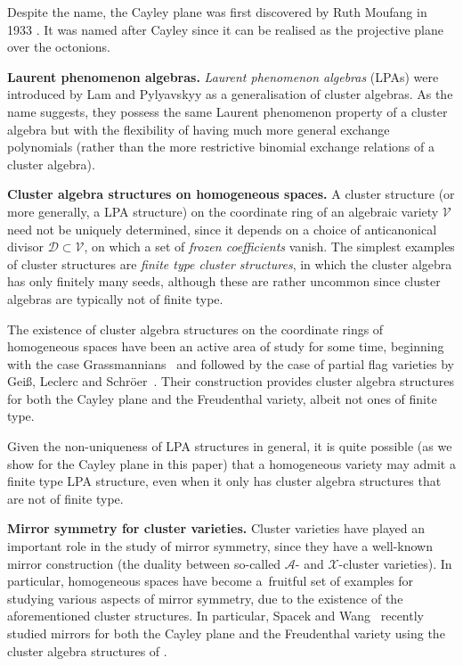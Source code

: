 \documentclass[pdftex]{sigma}
\numberwithin{equation}{section}
\theoremstyle{definition}
\begin{document}
Despite the name, the Cayley plane was first discovered by Ruth Moufang in 1933 \cite{m}. It was named after Cayley since it can be realised as the projective plane over the octonions.

{\bf Laurent phenomenon algebras.}
\emph{Laurent phenomenon algebras} (LPAs) were introduced by Lam and Pylyavskyy \cite{lp} as a generalisation of cluster algebras. As the name suggests, they possess the same Laurent phenomenon property of a cluster algebra but with the flexibility of having much more general exchange polynomials (rather than the more restrictive binomial exchange relations of a cluster algebra).

{\bf Cluster algebra structures on homogeneous spaces.}
A cluster structure (or more generally, a LPA structure) on the coordinate ring of an algebraic variety $\mathcal V$ need not be uniquely determined, since it depends on a choice of anticanonical divisor $\mathcal D\subset \mathcal V$, on which a set of \emph{frozen coefficients} vanish. The simplest examples of cluster structures are \emph{finite type cluster structures}, in which the cluster algebra has only finitely many seeds, although these are rather uncommon since cluster algebras are typically not of finite type.

The existence of cluster algebra structures on the coordinate rings of homogeneous spaces have been an active area of study for some time, beginning with the case Grassmannians~\cite{scott} and followed by the case of partial flag varieties by Gei{\ss}, Leclerc and Schr\"oer~\cite{GLS}. Their construction provides cluster algebra structures for both the Cayley plane and the Freudenthal variety, albeit not ones of finite type.

Given the non-uniqueness of LPA structures in general, it is quite possible (as we show for the Cayley plane in this paper) that a homogeneous variety may admit a finite type LPA structure, even when it only has cluster algebra structures that are not of finite type.

{\bf Mirror symmetry for cluster varieties.}
Cluster varieties have played an important role in the study of mirror symmetry, since they have a well-known mirror construction (the duality between so-called $\mathcal A$- and $\mathcal X$-cluster varieties). In particular, homogeneous spaces have become a~fruitful set of examples for studying various aspects of mirror symmetry, due to the existence of the aforementioned cluster structures. In particular, Spacek and Wang~\cite{Spacek-Wang} recently studied mirrors for both the Cayley plane and the Freudenthal variety using the cluster algebra structures of \cite{GLS}.
\end{document}
